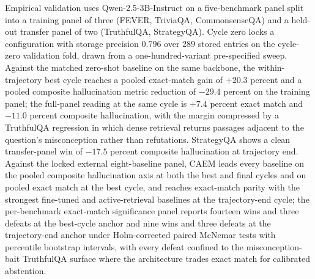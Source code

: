 Empirical validation uses Qwen-2.5-3B-Instruct on a five-benchmark panel split into a training panel of three (FEVER, TriviaQA, CommonsenseQA) and a held-out transfer panel of two (TruthfulQA, StrategyQA). Cycle zero locks a configuration with storage precision $0.796$ over $289$ stored entries on the cycle-zero validation fold, drawn from a one-hundred-variant pre-specified sweep. Against the matched zero-shot baseline on the same backbone, the within-trajectory best cycle reaches a pooled exact-match gain of $+20.3$ percent and a pooled composite hallucination metric reduction of $-29.4$ percent on the training panel; the full-panel reading at the same cycle is $+7.4$ percent exact match and $-11.0$ percent composite hallucination, with the margin compressed by a TruthfulQA regression in which dense retrieval returns passages adjacent to the question's misconception rather than refutations. StrategyQA shows a clean transfer-panel win of $-17.5$ percent composite hallucination at trajectory end. Against the locked external eight-baseline panel, CAEM leads every baseline on the pooled composite hallucination axis at both the best and final cycles and on pooled exact match at the best cycle, and reaches exact-match parity with the strongest fine-tuned and active-retrieval baselines at the trajectory-end cycle; the per-benchmark exact-match significance panel reports fourteen wins and three defeats at the best-cycle anchor and nine wins and three defeats at the trajectory-end anchor under Holm-corrected paired McNemar tests with percentile bootstrap intervals, with every defeat confined to the misconception-bait TruthfulQA surface where the architecture trades exact match for calibrated abstention.

